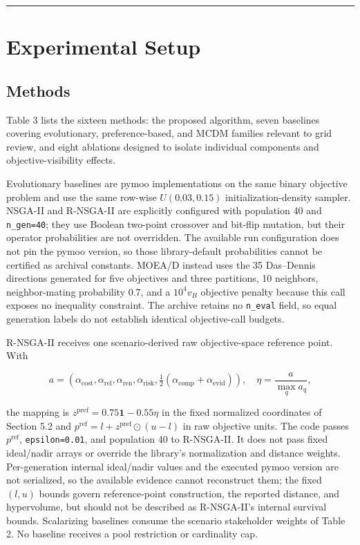 \documentclass[energies,article,submit,moreauthors]{Definitions/mdpi}
\begin{document}
\begin{center}\rule{0.5\linewidth}{0.5pt}\end{center}

\section{Experimental Setup}\label{experimental-setup}

\subsection{Methods}\label{methods}

Table 3 lists the sixteen methods: the proposed algorithm, seven baselines covering evolutionary, preference-based, and MCDM families relevant to grid review, and eight ablations designed to isolate individual components and objective-visibility effects.

Evolutionary baselines are pymoo implementations on the same binary objective problem and use the same row-wise \(U(0.03,0.15)\) initialization-density sampler. NSGA-II and R-NSGA-II are explicitly configured with population 40 and \texttt{n\_gen=40}; they use Boolean two-point crossover and bit-flip mutation, but their operator probabilities are not overridden. The available run configuration does not pin the pymoo version, so those library-default probabilities cannot be certified as archival constants. MOEA/D instead uses the 35 Das--Dennis directions generated for five objectives and three partitions, 10 neighbors, neighbor-mating probability 0.7, and a \(10^4v_B\) objective penalty because this call exposes no inequality constraint. The archive retains no \texttt{n\_eval} field, so equal generation labels do not establish identical objective-call budgets.

R-NSGA-II receives one scenario-derived raw objective-space reference point. With

\[
a=(\alpha_{\mathrm{cost}},\alpha_{\mathrm{rel}},\alpha_{\mathrm{ren}},
\alpha_{\mathrm{risk}},\tfrac12(\alpha_{\mathrm{comp}}+\alpha_{\mathrm{evid}})),
\quad \eta=\frac{a}{\max_q a_q},
\]

the mapping is \(z^{\mathrm{pref}}=0.75\mathbf1-0.55\eta\) in the fixed normalized coordinates of Section 5.2 and \(p^{\mathrm{ref}}=l+z^{\mathrm{pref}}\odot(u-l)\) in raw objective units. The code passes \(p^{\mathrm{ref}}\), \texttt{epsilon=0.01}, and population 40 to R-NSGA-II. It does not pass fixed ideal/nadir arrays or override the library's normalization and distance weights. Per-generation internal ideal/nadir values and the executed pymoo version are not serialized, so the available evidence cannot reconstruct them; the fixed \((l,u)\) bounds govern reference-point construction, the reported distance, and hypervolume, but should not be described as R-NSGA-II's internal survival bounds. Scalarizing baselines consume the scenario stakeholder weights of Table 2. No baseline receives a pool restriction or cardinality cap.
\end{document}
